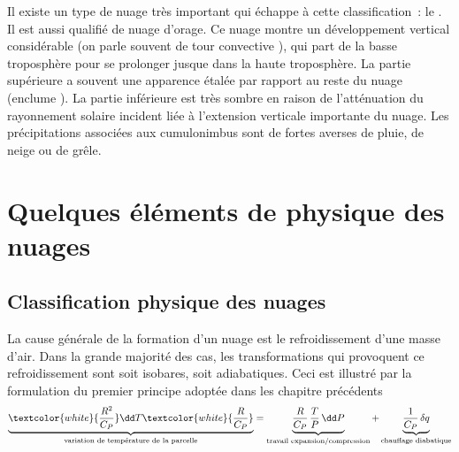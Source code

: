 Il existe un type de nuage très important qui échappe à cette classification~: le . Il est aussi qualifié de nuage d'orage. Ce nuage montre un développement vertical considérable (on parle souvent de \og tour convective \fg), qui part de la basse troposphère pour se prolonger jusque dans la haute troposphère. La partie supérieure a souvent une apparence étalée par rapport au reste du nuage (\og enclume \fg). La partie inférieure est très sombre en raison de l'atténuation du rayonnement solaire incident liée à l'extension verticale importante du nuage. Les précipitations associées aux cumulonimbus sont de fortes averses de pluie, de neige ou de grêle.

\mk
\section{Quelques éléments de physique des nuages}

\sk
\subsection{Classification physique des nuages} \label{classphys}

\sk
La cause générale de la formation d'un nuage est le refroidissement d'une masse d'air. Dans la grande majorité des cas, les transformations qui provoquent ce refroidissement sont soit isobares, soit adiabatiques. Ceci est illustré par la formulation du premier principe adoptée dans les chapitre précédents
\[ \underbrace{\textcolor{white}{\frac{R^2}{C_P}} \dd T \textcolor{white}{\frac{R}{C_P}}}_{\text{variation de température de la parcelle}} = \underbrace{\frac{R}{C_P} \, \frac{T}{P} \, \dd P}_{\text{travail expansion/compression}} + \underbrace{\frac{1}{C_P} \, \delta q}_{\text{chauffage diabatique}} \]

